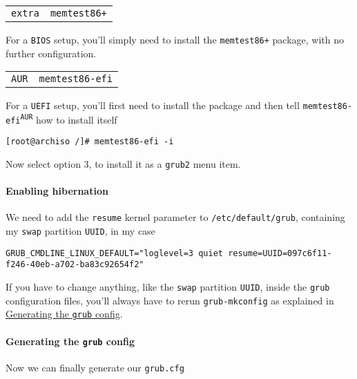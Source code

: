 \documentclass[9pt]{report}
\newenvironment{NOTE}
{\begin{tcolorbox}[colback=admonitionBG,coltitle=draculaFG,colframe=draculaBlue,colbacktitle=draculaBlue,title=NOTE]}
{\end{tcolorbox}}
\newenvironment{packagetable}
{\begin{longtabu}to \textwidth [b]{X[1,r]|X[1,l]}}
{\end{longtabu}}
\begin{document}
\begin{packagetable}
    \texttt{extra} & \texttt{memtest86+} \\ 
\end{packagetable}

For a \texttt{BIOS} setup, you’ll simply need to install the \texttt{memtest86+} package, with no further configuration.


\begin{packagetable}
    \texttt{AUR} & \texttt{memtest86-efi} \\ 
\end{packagetable}

For a \texttt{UEFI} setup, you’ll first need to install the package and then tell \texttt{memtest86-efi\textsuperscript{\texttt{AUR}}} how to install itself


\begin{verbatim}
[root@archiso /]# memtest86-efi -i
\end{verbatim}

Now select option 3, to install it as a \texttt{grub2} menu item.



\newpage

\hypertarget{x-enabling-hibernation}{\paragraph{Enabling hibernation}}
We need to add the \texttt{resume} kernel parameter to \texttt{/etc/default/grub}, containing my \texttt{swap} partition \texttt{UUID}, in my case


\begin{verbatim}
GRUB_CMDLINE_LINUX_DEFAULT="loglevel=3 quiet resume=UUID=097c6f11-f246-40eb-a702-ba83c92654f2"
\end{verbatim}

\begin{NOTE}
    If you have to change anything, like the \texttt{swap} partition \texttt{UUID}, inside the \texttt{grub} configuration files, you’ll always have to rerun \texttt{grub-mkconfig} as explained in \hyperlink{generating-the-grub-config}{Generating the \texttt{grub} config}.

\end{NOTE}
\hypertarget{x-generating-the-grub-config}{\paragraph{Generating the \texttt{grub} config}}
Now we can finally generate our \texttt{grub.cfg}
\end{document}
